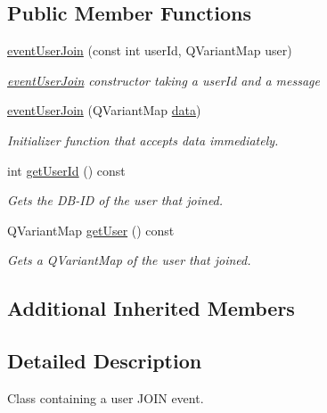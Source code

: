 \subsection*{Public Member Functions}
\begin{DoxyCompactItemize}
\item 
\hyperlink{classshared_1_1events_1_1event_user_join_ab486ae25fa5933ec647e5d19574d3f66}{event\-User\-Join} (const int user\-Id, Q\-Variant\-Map user)
\begin{DoxyCompactList}\small\item\em \hyperlink{classshared_1_1events_1_1event_user_join}{event\-User\-Join} constructor taking a user\-Id and a message \end{DoxyCompactList}\item 
\hyperlink{classshared_1_1events_1_1event_user_join_a96881447be0a8c8383a758048b72953d}{event\-User\-Join} (Q\-Variant\-Map \hyperlink{classshared_1_1events_1_1cls_event_a6cfb6b96d72fc1e7a101e61061ec2755}{data})
\begin{DoxyCompactList}\small\item\em Initializer function that accepts data immediately. \end{DoxyCompactList}\item 
int \hyperlink{classshared_1_1events_1_1event_user_join_ab1386fad8a4b2bb51e62589565090d5a}{get\-User\-Id} () const 
\begin{DoxyCompactList}\small\item\em Gets the D\-B-\/\-I\-D of the user that joined. \end{DoxyCompactList}\item 
Q\-Variant\-Map \hyperlink{classshared_1_1events_1_1event_user_join_afd49e93a57440f97dd02ccbec353cdb8}{get\-User} () const 
\begin{DoxyCompactList}\small\item\em Gets a Q\-Variant\-Map of the user that joined. \end{DoxyCompactList}\end{DoxyCompactItemize}
\subsection*{Additional Inherited Members}


\subsection{Detailed Description}
Class containing a user J\-O\-I\-N event. 

